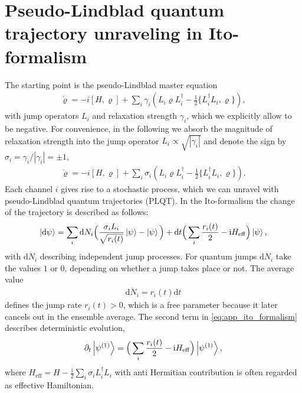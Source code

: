 \documentclass[twocolumn,prl,superscriptaddress]{revtex4-2}
\renewcommand{\i}{\mathrm i}
\begin{document}
\section{Pseudo-Lindblad quantum trajectory unraveling in Ito-formalism}
The starting point is the pseudo-Lindblad master equation
\begin{align}
	\dot \varrho = -i[H, \varrho] + \sum\limits_{i} \gamma_i \left( L_i \varrho L_i^\dagger - \frac{1}{2} \{ L_i^\dagger L_i,\varrho \} \right) ,
\end{align}
with jump operators $L_i$ and relaxation strength $\gamma_i$, which we explicitly allow to be negative. For convenience, in the following we absorb the magnitude of relaxation strength into the jump operator $L_i \propto \sqrt{|\gamma_i|}$ and denote the sign by $\sigma_i=\gamma_i/|\gamma_i|=\pm 1$,
\begin{align}
	\dot \varrho = -i[H, \varrho] + \sum\limits_{i} \sigma_i \left( L_i \varrho L_i^\dagger - \frac{1}{2} \{ L_i^\dagger L_i,\varrho \} \right) .
	\label{eq:app_pseudo_lindblad}
\end{align}
Each channel $i$ gives rise to a stochastic process, which we can unravel with pseudo-Lindblad quantum trajectories (PLQT). In the Ito-formalism the change of the trajectory is described as follows:
\begin{align}
	\ket{ \mathrm d\psi} = \sum_i \mathrm d N_i \Big(\frac{\sigma_i L_i }{\sqrt{ r_i(t)}} \ket{\psi} - \ket \psi \Big) + \mathrm d t \Big( \sum_i \frac{ r_i(t)}{2} - \i H_\mathrm{eff} \Big) \ket \psi ,
	\label{eq:app_ito_formalism}
\end{align}
with $\mathrm d N_i$ describing independent jump processes. For quantum jumps $\mathrm d N_i$ take the values $1$ or $0$, depending on whether a jump takes place or not. The average value
\begin{align}
	\overline{\mathrm d N_i} =  r_i(t) \mathrm d t
\end{align}
defines the jump rate $r_i(t)>0$, which is a free parameter because it later cancels out in the ensemble average. The second term in \cref{eq:app_ito_formalism} describes deterministic evolution, 
\begin{align}
	\partial_t \ket{\psi^{(1)}} = \Big(\sum_i \frac{ r_i(t)}{2} - \i H_\mathrm{eff} \Big) \ket{\psi^{(1)}}  ,
	\label{eq:app_deterministic}
\end{align}
where $H_\mathrm{eff} = H - \frac{\i}{2} \sum_i \sigma_i L_i^\dagger L_i$ with anti Hermitian contribution is often regarded as effective Hamiltonian. 
\end{document}
